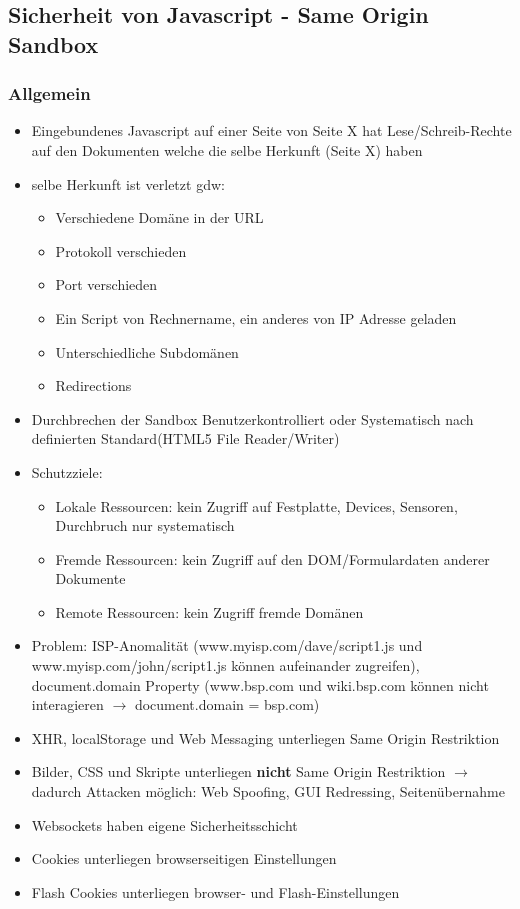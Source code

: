 \documentclass{article} %
\begin{document}
	
	\subsection{Sicherheit von Javascript - Same Origin Sandbox}
	\subsubsection{Allgemein}
	\begin{itemize}
		\item Eingebundenes Javascript auf einer Seite von Seite X hat Lese/Schreib-Rechte auf den Dokumenten welche die selbe Herkunft (Seite X) haben
		\item selbe Herkunft ist verletzt gdw:
		\begin{itemize}
			\item Verschiedene Domäne in der URL
			\item Protokoll verschieden
			\item Port verschieden
			\item Ein Script von Rechnername, ein anderes von IP Adresse geladen
			\item Unterschiedliche Subdomänen
			\item Redirections
		\end{itemize}
		\item Durchbrechen der Sandbox Benutzerkontrolliert oder Systematisch nach definierten Standard(HTML5 File Reader/Writer)
		\item Schutzziele:
		\begin{itemize}
			\item Lokale Ressourcen: kein Zugriff auf Festplatte, Devices, Sensoren, Durchbruch nur systematisch
			\item Fremde Ressourcen: kein Zugriff auf den DOM/Formulardaten anderer Dokumente
			\item Remote Ressourcen: kein Zugriff fremde Domänen
		\end{itemize}
		\item Problem: ISP-Anomalität (www.myisp.com/dave/script1.js und www.myisp.com/john/script1.js können aufeinander zugreifen), document.domain Property (www.bsp.com und wiki.bsp.com können nicht interagieren $\rightarrow$ document.domain = \glqq bsp.com\grqq)
		\item XHR, localStorage und Web Messaging unterliegen Same Origin Restriktion
		\item Bilder, CSS und Skripte unterliegen \textbf{nicht} Same Origin Restriktion $\rightarrow$ dadurch Attacken möglich: Web Spoofing, GUI Redressing, Seitenübernahme
		\item Websockets haben eigene Sicherheitsschicht
		\item Cookies unterliegen browserseitigen Einstellungen
		\item Flash Cookies unterliegen browser- und Flash-Einstellungen
	\end{itemize}
\end{document}
